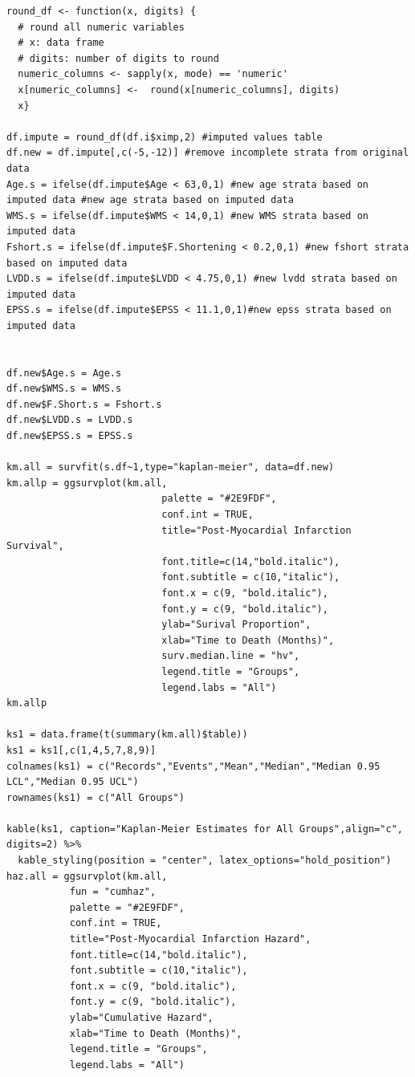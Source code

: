 \documentclass[
]{article}
\begin{document}
\begin{verbatim}
round_df <- function(x, digits) {
  # round all numeric variables
  # x: data frame 
  # digits: number of digits to round
  numeric_columns <- sapply(x, mode) == 'numeric'
  x[numeric_columns] <-  round(x[numeric_columns], digits)
  x}

df.impute = round_df(df.i$ximp,2) #imputed values table
df.new = df.impute[,c(-5,-12)] #remove incomplete strata from original data
Age.s = ifelse(df.impute$Age < 63,0,1) #new age strata based on imputed data #new age strata based on imputed data
WMS.s = ifelse(df.impute$WMS < 14,0,1) #new WMS strata based on imputed data
Fshort.s = ifelse(df.impute$F.Shortening < 0.2,0,1) #new fshort strata based on imputed data
LVDD.s = ifelse(df.impute$LVDD < 4.75,0,1) #new lvdd strata based on imputed data
EPSS.s = ifelse(df.impute$EPSS < 11.1,0,1)#new epss strata based on imputed data


df.new$Age.s = Age.s
df.new$WMS.s = WMS.s
df.new$F.Short.s = Fshort.s
df.new$LVDD.s = LVDD.s
df.new$EPSS.s = EPSS.s

km.all = survfit(s.df~1,type="kaplan-meier", data=df.new)
km.allp = ggsurvplot(km.all, 
                           palette = "#2E9FDF", 
                           conf.int = TRUE, 
                           title="Post-Myocardial Infarction Survival", 
                           font.title=c(14,"bold.italic"),
                           font.subtitle = c(10,"italic"),
                           font.x = c(9, "bold.italic"),
                           font.y = c(9, "bold.italic"),
                           ylab="Surival Proportion", 
                           xlab="Time to Death (Months)",
                           surv.median.line = "hv",
                           legend.title = "Groups",
                           legend.labs = "All")
km.allp

ks1 = data.frame(t(summary(km.all)$table))
ks1 = ks1[,c(1,4,5,7,8,9)]
colnames(ks1) = c("Records","Events","Mean","Median","Median 0.95 LCL","Median 0.95 UCL")
rownames(ks1) = c("All Groups")

kable(ks1, caption="Kaplan-Meier Estimates for All Groups",align="c", digits=2) %>%
  kable_styling(position = "center", latex_options="hold_position")
haz.all = ggsurvplot(km.all, 
           fun = "cumhaz",
           palette = "#2E9FDF", 
           conf.int = TRUE, 
           title="Post-Myocardial Infarction Hazard", 
           font.title=c(14,"bold.italic"),
           font.subtitle = c(10,"italic"),
           font.x = c(9, "bold.italic"),
           font.y = c(9, "bold.italic"),
           ylab="Cumulative Hazard", 
           xlab="Time to Death (Months)",
           legend.title = "Groups",
           legend.labs = "All")
           

\end{verbatim}
\end{document}
